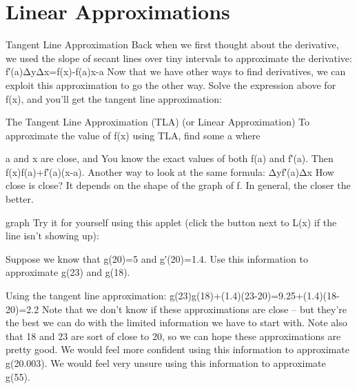 \section{Linear Approximations}
\label{sec:linapprox}

Tangent Line Approximation
Back when we first thought about the derivative, we used the slope of secant lines over tiny intervals to approximate the derivative:
f′(a)\approx   ΔyΔx=f(x)-f(a)x-a
Now that we have other ways to find derivatives, we can exploit this approximation to go the other way. Solve the expression above for f(x), and you’ll get the tangent line approximation:

The Tangent Line Approximation (TLA) (or Linear Approximation)
To approximate the value of f(x) using TLA, find some a where

a and x are close, and
You know the exact values of both f(a) and f′(a).
Then
f(x)\approx   f(a)+f′(a)(x-a).
Another way to look at the same formula:
Δy\approx   f′(a)Δx
How close is close? It depends on the shape of the graph of f. In general, the closer the better.

graph
Try it for yourself using this applet (click the button next to L(x) if the line isn't showing up):

\begin{example}
Suppose we know that g(20)=5 and g′(20)=1.4. Use this information to approximate g(23) and g(18).

\begin{solution} Using the tangent line approximation:
g(23)\approx   g(18)+(1.4)(23-20)=9.25+(1.4)(18-20)=2.2
Note that we don't know if these approximations are close – but they're the best we can do with the limited information we have to start with. Note also that 18 and 23 are sort of close to 20, so we can hope these approximations are pretty good. We would feel more confident using this information to approximate g(20.003). We would feel very unsure using this information to approximate g(55).
\end{solution}\end{example}
